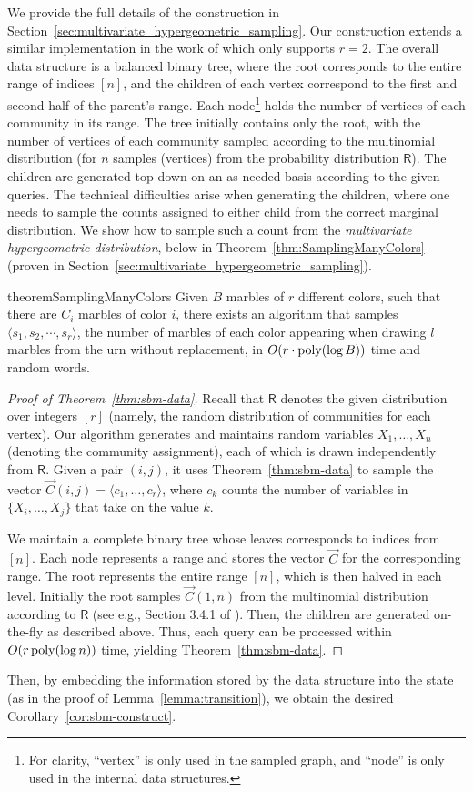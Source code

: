 We provide the full details of the construction in Section~\ref{sec:multivariate_hypergeometric_sampling}.
Our construction extends a similar implementation in the work of \cite{huge} which only supports $r = 2$.
The overall data structure is a balanced binary tree, where the root corresponds to the entire range of indices $[n]$,
and the children of each vertex correspond to the first and second half of the parent's range.
Each node\footnote{For clarity, ``vertex'' is only used in the sampled graph, and ``node'' is only used in the internal data structures.}
holds the number of vertices of each community in its range.
The tree initially contains only the root, with the number of vertices of each community sampled according to the multinomial distribution
(for $n$ samples (vertices) from the probability distribution $\mathsf{R}$).
The children are generated top-down on an as-needed basis according to the given queries.
The technical difficulties arise when generating the children,
where one needs to sample the counts assigned to either child from the correct marginal distribution.
We show how to sample such a count from the \emph{multivariate hypergeometric distribution},
below in Theorem~\ref{thm:SamplingManyColors} (proven in Section~\ref{sec:multivariate_hypergeometric_sampling}).

\begin{restatable}{theorem}{SamplingManyColors}
\label{thm:SamplingManyColors}
Given $B$ marbles of $r$ different colors, such that there are $C_i$ marbles of color $i$,
there exists an algorithm that samples $\langle s_1, s_2,\cdots, s_r \rangle$,
the number of marbles of each color appearing when drawing $l$ marbles from the urn without replacement,
in $O(r\cdot\mathrm{poly}(\log B))$ time and random words.
\end{restatable}
\begin{proof}[Proof of Theorem~\ref{thm:sbm-data}]
Recall that $\mathsf{R}$ denotes the given distribution over integers $[r]$ (namely, the random distribution of communities for each vertex).
Our algorithm generates and maintains random variables $X_1, \ldots, X_n$ (denoting the community assignment),
each of which is drawn independently from $\mathsf{R}$.
Given a pair $(i, j)$, it uses Theorem~\ref{thm:sbm-data} to sample the vector $\vec{C}(i, j) = \langle c_1, \ldots, c_r \rangle$,
where $c_k$ counts the number of variables in $\{X_i, \ldots, X_j\}$ that take on the value $k$.

We maintain a complete binary tree whose leaves corresponds to indices from $[n]$.
Each node represents a range and stores the vector $\vec{C}$ for the corresponding range.
The root represents the entire range $[n]$, which is then halved in each level.
Initially the root samples $\vec{C}(1, n)$ from the multinomial distribution according to $\mathsf{R}$
(see e.g., Section 3.4.1 of \cite{knuth}).
Then, the children are generated on-the-fly as described above.
Thus, each query can be processed within $O(r\,\mathrm{poly}(\log n))$ time, yielding Theorem~\ref{thm:sbm-data}.
\end{proof}

Then, by embedding the information stored by the data structure into the state (as in the proof of Lemma~\ref{lemma:transition}),
we obtain the desired Corollary~\ref{cor:sbm-construct}.
